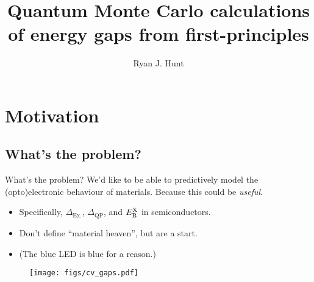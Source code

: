 \documentclass[12pt, pdf, hyperref={draft}, usenames, dvipsnames]{beamer}
\title{Quantum Monte Carlo calculations of energy gaps from
first-principles}
\author{Ryan J. Hunt}
\institute[]{\
  Department of Physics,\\
  Lancaster University
}
\date{}
\begin{document}
\begin{frame}[plain]
  \titlepage
\end{frame}




\section{Motivation}

\subsection{What's the problem?}

\begin{frame}{What's the problem?}
We'd like to be able to predictively model the (opto)electronic behaviour of
materials. Because this could be {\it useful}.
\vfill
\begin{minipage}[t]{0.55\textwidth}
\vspace{1.2cm}
\begin{itemize}
  \item Specifically, $\Delta_{\text{Ex.}}$, $\Delta_{\text{QP}}$, and $E^{\rm
  X}_{\rm B}$ in semiconductors.
  \item Don't define ``material heaven'', but are a start.
  \item (The blue LED is blue for a reason.)
\end{itemize}
\end{minipage}%
\hfill
\begin{minipage}[t]{0.4\textwidth}
\vspace{0pt}
\begin{figure}[H]
  \centering
  \texttt{[image: figs/cv\_gaps.pdf]}
\label{fig:name}
\end{figure}
\end{minipage}%
\end{frame}
\end{document}
